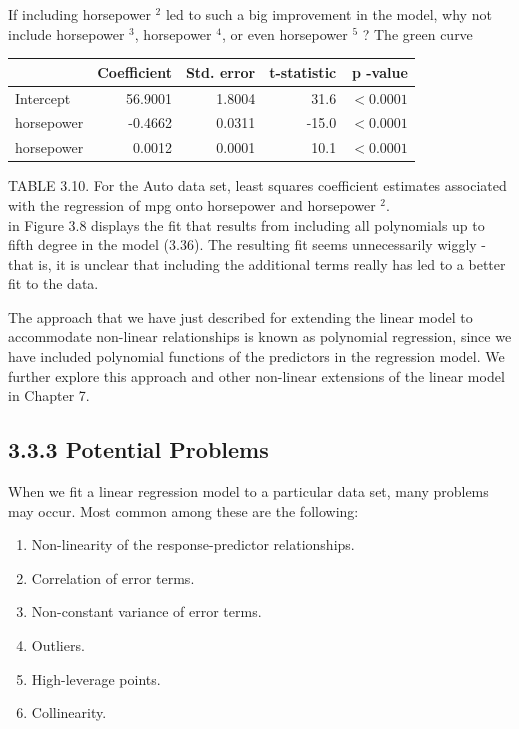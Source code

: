 \documentclass[10pt]{article}
\begin{document}
If including horsepower ${ }^{2}$ led to such a big improvement in the model, why not include horsepower ${ }^{3}$, horsepower ${ }^{4}$, or even horsepower ${ }^{5}$ ? The green curve

\begin{center}
\begin{tabular}{l|rrrr}
\hline
 & Coefficient & Std. error & t-statistic & p -value \\
\hline
Intercept & 56.9001 & 1.8004 & 31.6 & $<0.0001$ \\
horsepower & -0.4662 & 0.0311 & -15.0 & $<0.0001$ \\
horsepower & 0.0012 & 0.0001 & 10.1 & $<0.0001$ \\
\hline
\end{tabular}
\end{center}

TABLE 3.10. For the Auto data set, least squares coefficient estimates associated with the regression of mpg onto horsepower and horsepower ${ }^{2}$.\\
in Figure 3.8 displays the fit that results from including all polynomials up to fifth degree in the model (3.36). The resulting fit seems unnecessarily wiggly - that is, it is unclear that including the additional terms really has led to a better fit to the data.

The approach that we have just described for extending the linear model to accommodate non-linear relationships is known as polynomial regression, since we have included polynomial functions of the predictors in the regression model. We further explore this approach and other non-linear extensions of the linear model in Chapter 7.

\subsection*{3.3.3 Potential Problems}
When we fit a linear regression model to a particular data set, many problems may occur. Most common among these are the following:

\begin{enumerate}
  \item Non-linearity of the response-predictor relationships.
  \item Correlation of error terms.
  \item Non-constant variance of error terms.
  \item Outliers.
  \item High-leverage points.
  \item Collinearity.
\end{enumerate}
\end{document}
